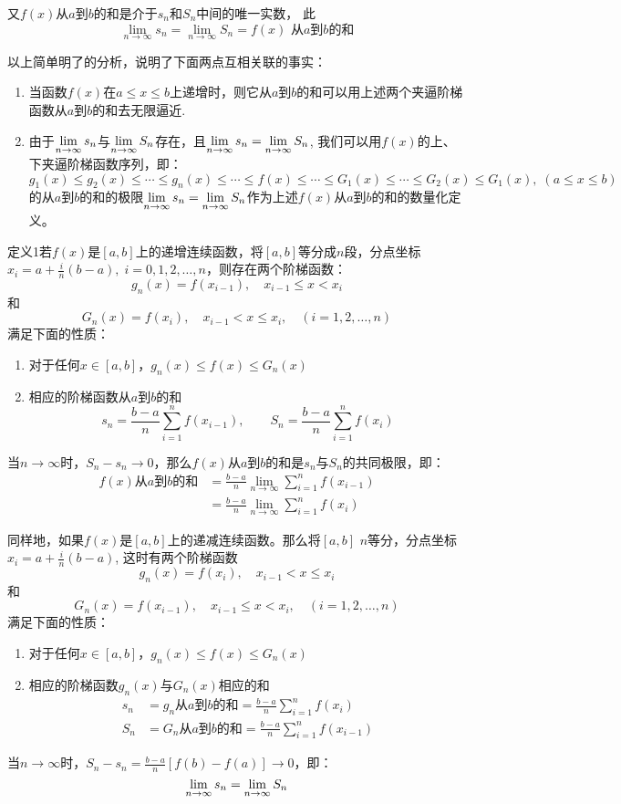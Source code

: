 \begin{solution}
又$f(x)$从$a$到$b$的和是介于$s_n$和$S_n$中间的唯一实数，
此
\[\lim_{n\to\infty} s_n=\lim_{n\to\infty} S_n=f(x)\text{ 从$a$到$b$的和}\]

以上简单明了的分析，说明了下面两点互相关联的事实：
\begin{enumerate}
    \item 当函数$f(x)$在$a\le x\le b$上递增时，则它从$a$到$b$的和可以用上述两个夹逼阶梯函数从$a$到$b$的和去无限逼近.
    \item 由于$\displaystyle\lim_{n\to\infty}s_n$与$\displaystyle\lim_{n\to\infty}S_n$存在，且$\displaystyle\lim_{n\to\infty}s_n=\displaystyle\lim_{n\to\infty}S_n$, 我们可以用$f(x)$的上、下夹逼阶梯函数序列，即：$g_1 (x)\le g_2(x)\le \cdots\le g_n(x)\le \cdots\le f(x)\le \cdots\le G_1(x)\le \cdots\le G_2(x)\le G_1(x),\; (a\le x\le b)$的从$a$到$b$的和的极限$\displaystyle\lim_{n\to\infty}s_n=\displaystyle\lim_{n\to\infty}S_n$作为上述$f(x)$从$a$到$b$的和的数量化定义。
\end{enumerate}
\end{solution}

\begin{blk}
    {定义1}若$f(x)$是$[a,b]$上的递增连续函数，将$[a,b]$等分成$n$段，分点坐标$x_i=a+\frac{i}{n}(b-a),\; i=0,1, 2,\ldots,n$，则存在两个阶梯函数：
\[    g_n (x) =f (x_{i-1}) ,\quad x_{i-1}\le  x< x_i\]
    和
\[    G_n (x)=f(x_i),\quad x_{i-1}<x\le x_i,\quad (i=1,2,\ldots,n)\]
满足下面的性质：
\begin{enumerate}
    \item 对于任何$x\in[a,b]$，$g_n(x)\le f(x)\le G_n(x)$
    \item 相应的阶梯函数从$a$到$b$的和
\[s_n=\frac{b-a}{n}\sum^n_{i=1}f(x_{i-1}),\qquad S_n=\frac{b-a}{n}\sum^n_{i=1}f(x_{i})  \]
\end{enumerate}
当$n\to\infty$时，$S_n-s_n\to 0$，那么$f(x)$从$a$到$b$的和是$s_n$与$S_n$的共同极限，即：
\[\begin{split}
f(x)\text{从$a$到$b$的和}&=\frac{b-a}{n}\lim_{n\to\infty}\sum^n_{i=1}f(x_{i-1})\\
&=\frac{b-a}{n}\lim_{n\to\infty}\sum^n_{i=1}f(x_{i})
\end{split}\]

同样地，如果$f(x)$是$[a,b]$上的递减连续函数。那么将$[a,b]$ $n$等分，分点坐标$x_i=a+\frac{i}{n}(b-a)$, 这时有两个阶梯函数
\[    g_n (x) =f (x_{i}) ,\quad x_{i-1}<  x\le x_i\]
    和
\[    G_n (x)=f(x_{i-1}),\quad x_{i-1}\le x< x_i,\quad (i=1,2,\ldots,n)\]
满足下面的性质：
\begin{enumerate}
    \item 对于任何$x\in[a,b]$，$g_n(x)\le f(x)\le G_n(x)$
    \item 相应的阶梯函数$g_n(x)$与$G_n(x)$相应的和
\[\begin{split}
    s_n&=g_n\text{从$a$到$b$的和}=\frac{b-a}{n}\sum^n_{i=1}f(x_{i})\\
    S_n&=G_n\text{从$a$到$b$的和}=\frac{b-a}{n}\sum^n_{i=1}f(x_{i-1})  
\end{split}\]
\end{enumerate}
当$n\to\infty$时，$S_n-s_n=\frac{b-a}{n}\left[f(b)-f(a)\right]\to 0$，即：
\[\displaystyle\lim_{n\to\infty}s_n=\displaystyle\lim_{n\to\infty}S_n\]
\end{blk}

